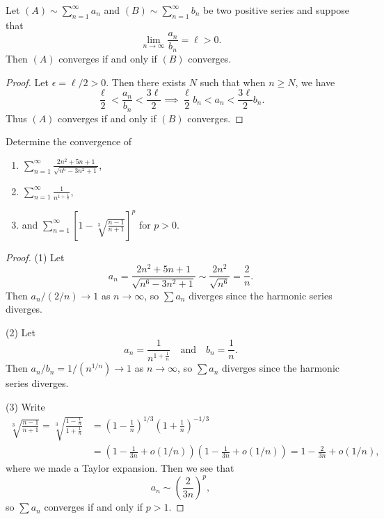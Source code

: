 \begin{theorem}
  Let $(A) \sim \sum_{n = 1}^\infty a_n$ and
  $(B) \sim \sum_{n = 1}^\infty b_n$ be two positive
  series and suppose that
  \[
    \lim_{n \to \infty} \frac{a_n}{b_n} = \ell > 0.
  \]
  Then $(A)$ converges if and only if $(B)$ converges.
\end{theorem}

\begin{proof}
  Let $\epsilon = \ell / 2 > 0$. Then there exists $N$
  such that when $n \ge N$, we have
  \[
    \frac{\ell}{2} < \frac{a_n}{b_n} < \frac{3\ell}{2}
    \implies \frac{\ell}{2} b_n < a_n < \frac{3\ell}{2} b_n.
  \]
  Thus $(A)$ converges if and only if $(B)$ converges.
\end{proof}

\begin{example}
  Determine the convergence of
  \begin{enumerate}
    \item $\displaystyle \sum_{n = 1}^\infty \frac{2n^2 + 5n + 1}{\sqrt{n^6 - 3n^2 + 1}}$,
    \item $\displaystyle \sum_{n = 1}^\infty \frac{1}{n^{1 + \frac{1}{n}}}$,
    \item and $\displaystyle \sum_{n = 1}^\infty \left[1 - \sqrt[3]{\frac{n - 1}{n + 1}}\right]^p$ for $p > 0$.
  \end{enumerate}
\end{example}

\begin{proof}
  (1) Let
  \[
    a_n = \frac{2n^2 + 5n + 1}{\sqrt{n^6 - 3n^2 + 1}}
    \sim \frac{2n^2}{\sqrt{n^6}} = \frac{2}{n}.
  \]
  Then $a_n / (2 / n) \to 1$ as $n \to \infty$, so
  $\sum a_n$ diverges since the harmonic series
  diverges.

  (2) Let
  \[
    a_n = \frac{1}{n^{1 + \frac{1}{n}}}
    \quad \text{and} \quad
    b_n = \frac{1}{n}.
  \]
  Then $a_n / b_n = 1 / (n^{1 / n}) \to 1$ as $n \to \infty$,
  so $\sum a_n$ diverges since the harmonic series
  diverges.

  (3) Write
  \begin{align*}
    \sqrt[3]{\frac{n - 1}{n + 1}}
    = \sqrt[3]{\frac{1 - \frac{1}{n}}{1 + \frac{1}{n}}}
    &= \left(1 - \frac{1}{n}\right)^{1 / 3} \left(1 + \frac{1}{n}\right)^{-1 / 3} \\
    &= \left(1 - \frac{1}{3n} + o(1 / n)\right) \left(1 - \frac{1}{3n} + o(1 / n)\right)
    = 1 - \frac{2}{3n} + o(1 / n),
  \end{align*}
  where we made a Taylor expansion.
  Then we see that
  \[
    a_n \sim \left(\frac{2}{3n}\right)^p,
  \]
  so $\sum a_n$ converges if and only if $p > 1$.
\end{proof}

